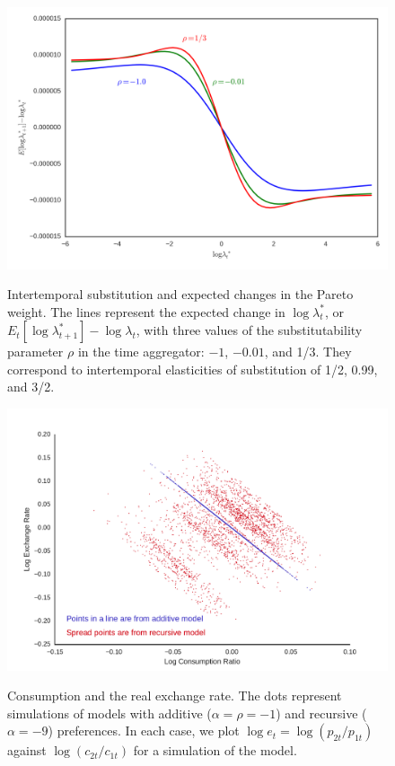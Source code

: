 \clearpage
\begin{figure}[htb]
\caption{Intertemporal substitution and expected changes in the Pareto weight.
The lines represent the expected change in $\log \lambda_t^*$, or $E_t[\log \lambda^*_{t+1}] - \log \lambda_t$,
with three values of the substitutability parameter $\rho$ in the time aggregator:
$-1$, $-0.01$, and 1/3.
They correspond to intertemporal elasticities of substitution of 1/2, 0.99, and 3/2. }

\bigskip
\includegraphics[width=\textwidth]{images/BCFL/Policies_Diff_rho.png}
\label{fig:change-pareto-weight-ies}
\end{figure}


\clearpage
\begin{figure}[htb]
\caption{Consumption and the real exchange rate.
The dots represent simulations of models with additive ($\alpha = \rho = -1$)
and recursive ($\alpha = -9$) preferences.
In each case, we plot  $\log e_t = \log (p_{2t}/p_{1t}) $ against $\log (c_{2t}/c_{1t}) $
for a simulation of the model. }

\includegraphics[width=\textwidth]{images/BCFL/con_v_fxr_alpha9.pdf}
\label{fig:exchange-cons-rer-two}
\end{figure}

